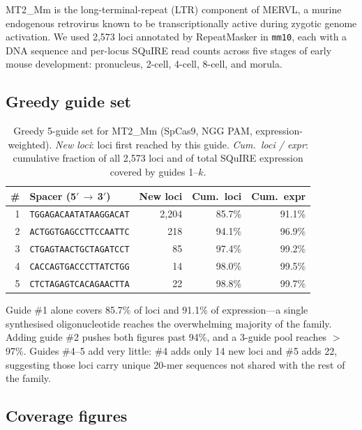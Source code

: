 \documentclass[11pt]{article}
\begin{document}
MT2\_Mm is the long-terminal-repeat (LTR) component of MERVL, a murine endogenous
retrovirus known to be transcriptionally active during zygotic genome activation.  We used
2,573 loci annotated by RepeatMasker in \texttt{mm10}, each with a DNA sequence and
per-locus SQuIRE read counts across five stages of early mouse development:
pronucleus, 2-cell, 4-cell, 8-cell, and morula.

\subsection{Greedy guide set}

\begin{table}[h]
  \centering
  \small
  \setlength{\tabcolsep}{7pt}
  \begin{tabular}{@{}r l r r r@{}}
    \toprule
    \textbf{\#} & \textbf{Spacer (5$'$\,$\rightarrow$\,3$'$)} &
      \textbf{New loci} & \textbf{Cum.\ loci} & \textbf{Cum.\ expr} \\
    \midrule
    1 & \texttt{TGGAGACAATATAAGGACAT} & 2,204 & 85.7\% & 91.1\% \\
    2 & \texttt{ACTGGTGAGCCTTCCAATTC} &   218 & 94.1\% & 96.9\% \\
    3 & \texttt{CTGAGTAACTGCTAGATCCT} &    85 & 97.4\% & 99.2\% \\
    4 & \texttt{CACCAGTGACCCTTATCTGG} &    14 & 98.0\% & 99.5\% \\
    5 & \texttt{CTCTAGAGTCACAGAACTTA} &    22 & 98.8\% & 99.7\% \\
    \bottomrule
  \end{tabular}
  \caption{Greedy 5-guide set for MT2\_Mm (SpCas9, NGG PAM, expression-weighted).
    \emph{New loci}: loci first reached by this guide.
    \emph{Cum.\ loci / expr}: cumulative fraction of all 2,573 loci and of total SQuIRE
    expression covered by guides 1--$k$.}
  \label{tab:greedy}
\end{table}

Guide \#1 alone covers 85.7\% of loci and 91.1\% of expression---a single synthesised
oligonucleotide reaches the overwhelming majority of the family.  Adding guide \#2
pushes both figures past 94\%, and a 3-guide pool reaches $>$97\%.  Guides \#4--5
add very little: \#4 adds only 14 new loci and \#5 adds 22, suggesting those loci
carry unique 20-mer sequences not shared with the rest of the family.

\subsection{Coverage figures}
\end{document}
